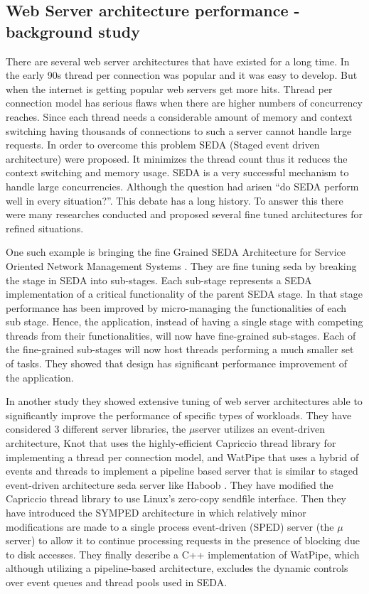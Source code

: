 \subsection{Web Server architecture performance - background study}

There are several web server architectures that have existed for a long time. In the early 90s thread per connection was popular and it was easy to develop. But when the internet is getting popular web servers get more hits. Thread per connection model has serious flaws when there are higher numbers of concurrency reaches. Since each thread needs a considerable amount of memory and context switching \cite{seda} having thousands of connections to such a server cannot handle large requests. In order to overcome this problem SEDA (Staged event driven architecture) \cite{seda} were proposed. It minimizes the thread count thus it reduces the context switching and memory usage. SEDA is a very successful mechanism to handle large concurrencies. Although the question had arisen “do SEDA perform well in every situation?”. \cite{Scalable_Threads_for_Internet_Services,events_are_bad,event_deriven_programming_for_robust_software} This debate has a long history. To answer this there were many researches conducted and proposed several fine tuned architectures for refined situations.

One such example is bringing the fine Grained SEDA Architecture for Service Oriented Network Management Systems \cite{fine_grained_SEDA}. They are fine tuning \acrshort{seda} by breaking the stage in SEDA into sub-stages. Each sub-stage represents a SEDA implementation of a critical functionality of the parent SEDA stage. In that stage performance has been improved by micro-managing the functionalities of each sub stage. Hence, the application, instead of having a single stage with competing threads from their functionalities, will now have fine-grained sub-stages. Each of the fine-grained sub-stages will now host threads performing a much smaller set of tasks. They showed that design has significant performance improvement of the application. 

In another study \cite{comp_ac} they showed extensive tuning of web server architectures able to significantly improve the performance of specific types of workloads. They have considered 3 different server libraries, the $\mu$server utilizes an event-driven architecture, Knot that uses the highly-efficient Capriccio thread library for  implementing a thread per connection model, and WatPipe that uses a hybrid of events and threads to implement a pipeline based server that is similar to staged event-driven architecture \acrfull{seda} server like Haboob \cite{seda}. They have  modified the Capriccio thread library to use Linux's zero-copy sendfile interface. Then they have introduced the \acrfull{SYMPED} architecture in which relatively minor modifications are made to a single process event-driven (SPED) \cite{flash_server} server (the $\mu$server) to allow it to continue processing requests in the presence of blocking due to disk accesses. They finally describe a C++ implementation of WatPipe, which although utilizing a pipeline-based architecture, excludes the dynamic controls over event queues and thread pools used in SEDA. 

